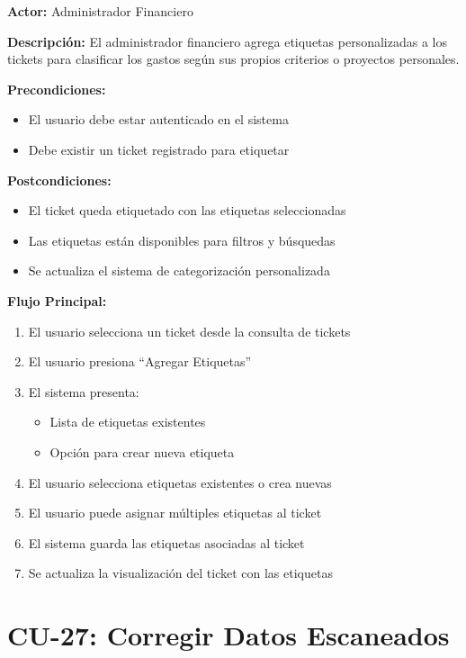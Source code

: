 \noindent\textbf{Actor:} Administrador Financiero

\noindent\textbf{Descripción:} El administrador financiero agrega etiquetas personalizadas a los tickets para clasificar los gastos según sus propios criterios o proyectos personales.

\noindent\textbf{Precondiciones:}
\begin{itemize}
    \item El usuario debe estar autenticado en el sistema
    \item Debe existir un ticket registrado para etiquetar
\end{itemize}

\noindent\textbf{Postcondiciones:}
\begin{itemize}
    \item El ticket queda etiquetado con las etiquetas seleccionadas
    \item Las etiquetas están disponibles para filtros y búsquedas
    \item Se actualiza el sistema de categorización personalizada
\end{itemize}

\noindent\textbf{Flujo Principal:}
\begin{enumerate}
    \item El usuario selecciona un ticket desde la consulta de tickets
    \item El usuario presiona ``Agregar Etiquetas''
    \item El sistema presenta:
    \begin{itemize}
        \item Lista de etiquetas existentes
        \item Opción para crear nueva etiqueta
    \end{itemize}
    \item El usuario selecciona etiquetas existentes o crea nuevas
    \item El usuario puede asignar múltiples etiquetas al ticket
    \item El sistema guarda las etiquetas asociadas al ticket
    \item Se actualiza la visualización del ticket con las etiquetas
\end{enumerate}

\section{CU-27: Corregir Datos Escaneados}

